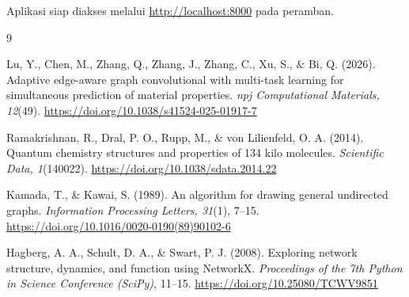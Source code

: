 \documentclass[a4paper,12pt]{report}
\begin{document}
Aplikasi siap diakses melalui \url{http://localhost:8000} pada peramban.

\begin{thebibliography}{9}

Lu, Y., Chen, M., Zhang, Q., Zhang, J., Zhang, C., Xu, S., \& Bi, Q. (2026).
Adaptive edge-aware graph convolutional with multi-task learning for simultaneous prediction of material properties.
\textit{npj Computational Materials, 12}(49).
\url{https://doi.org/10.1038/s41524-025-01917-7}

Ramakrishnan, R., Dral, P. O., Rupp, M., \& von Lilienfeld, O. A. (2014).
Quantum chemistry structures and properties of 134 kilo molecules.
\textit{Scientific Data, 1}(140022).
\url{https://doi.org/10.1038/sdata.2014.22}

Kamada, T., \& Kawai, S. (1989).
An algorithm for drawing general undirected graphs.
\textit{Information Processing Letters, 31}(1), 7--15.
\url{https://doi.org/10.1016/0020-0190(89)90102-6}

Hagberg, A. A., Schult, D. A., \& Swart, P. J. (2008).
Exploring network structure, dynamics, and function using NetworkX.
\textit{Proceedings of the 7th Python in Science Conference (SciPy)}, 11--15.
\url{https://doi.org/10.25080/TCWV9851}

\end{thebibliography}
\end{document}
